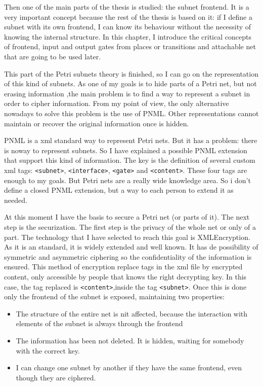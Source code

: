 Then one of the main parts of the thesis is studied: the subnet frontend.
It is a very important concept because the rest of the thesis is based on
it: if I define a subnet with its own frontend, I can know its behaviour without the necessity of knowing the internal structure. In this chapter, I introduce the critical concepts of frontend, input and output gates from
places or transitions and attachable net that are going to be used later.

This part of the Petri subnets theory is finished, so I can go on the representation
of this kind of subnets. As one of my goals is to hide parts of a Petri net,
but not erasing information ,the main problem is to find a way to represent
a subnet in order to cipher information. From my point of view, the only alternative nowadays to solve this problem is the use of PNML. Other representations
cannot maintain or recover the original information once is hidden.

PNML is a xml standard way to represent Petri nets. But it has a problem:
there is noway to represent subnets. So I have explained a possible PNML extension
that support this kind of information. The key is the definition of several custom xml tags: \texttt{<subnet>}, \texttt{<interface>}, \texttt{<gate>} and \texttt{<content>}. These four tags are enough to my goals. But Petri
nets are a really wide knowledge area. So i don't define a closed PNML extension, but a way to each person to extend it as needed. 

At this moment I have the basis to secure a Petri net (or parts of it). The
next step is the securization. The first step is the privacy of the whole
net or only of a part. The technology that I have selected to reach this goal is XMLEncryption. As it is an standard, it is widely extended and
well known. It has de possibility of symmetric and asymmetric ciphering so
the confidentiality of the information is ensured. This method of encryption replace tags in the xml file by encrypted content, only accessible by people
that
knows the right decrypting key. In this case, the tag replaced is \texttt{<content>},inside
the tag \texttt{<subnet>}. Once this is done only the frontend of the subnet
is exposed, maintaining two properties:

\begin{itemize}
\item The structure of the entire net is nit affected, because the interaction
with elements of the subnet is always through the frontend
\item The information has been not deleted. It is hidden, waiting for somebody
with the correct key.
\item I can change one subnet by another if they have the same frontend,
even though they are ciphered.
\end{itemize} 

